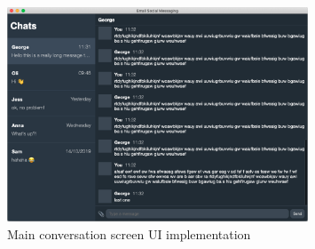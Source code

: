 \begin{figure}[h!]
  \centering
  \includegraphics[width=0.8\textwidth]{images/implementation-main.png}
  \caption{Main conversation screen UI implementation}
  \label{fig:login-ui}
\end{figure}